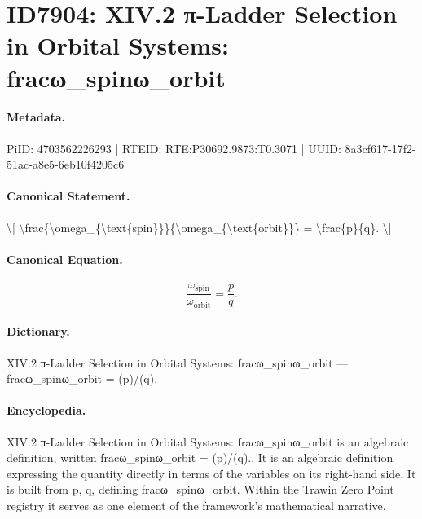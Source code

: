 \section*{ID7904: XIV.2 π-Ladder Selection in Orbital Systems: fracω\_spinω\_orbit}
\paragraph{Metadata.}
PiID: 4703562226293 | RTEID: RTE:P30692.9873:T0.3071 | UUID: 8a3cf617-17f2-51ac-a8e5-6eb10f4205c6

\paragraph{Canonical Statement.}
\textbackslash{}[ \textbackslash{}frac\{\textbackslash{}omega\_\{\textbackslash{}text\{spin\}\}\}\{\textbackslash{}omega\_\{\textbackslash{}text\{orbit\}\}\} = \textbackslash{}frac\{p\}\{q\}. \textbackslash{}]

\paragraph{Canonical Equation.}
\[
\frac{\omega_{\text{spin}}}{\omega_{\text{orbit}}} = \frac{p}{q}.
\]

\paragraph{Dictionary.}
XIV.2 π-Ladder Selection in Orbital Systems: fracω\_spinω\_orbit — fracω\_spinω\_orbit = (p)/(q).

\paragraph{Encyclopedia.}
XIV.2 π-Ladder Selection in Orbital Systems: fracω\_spinω\_orbit is an algebraic definition, written fracω\_spinω\_orbit = (p)/(q).. It is an algebraic definition expressing the quantity directly in terms of the variables on its right-hand side. It is built from p, q, defining fracω\_spinω\_orbit. Within the Trawin Zero Point registry it serves as one element of the framework's mathematical narrative.
